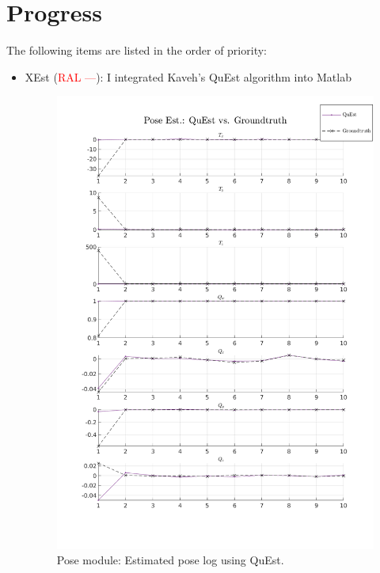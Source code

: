 \documentclass[11pt]{article}
\begin{document}
\section{Progress}
The following items are listed in the order of priority:
\begin{itemize}
    \item XEst (\textcolor{red}{RAL ---}): I integrated Kaveh's QuEst algorithm
    into Matlab

    \begin{figure}[H]
      \begin{center}
        \includegraphics[width=\linewidth]{plt_pos_log_QuEst.png}
      \end{center}
      \caption{Pose module: Estimated pose log using QuEst.}
    \end{figure}


\end{itemize}
\end{document}
